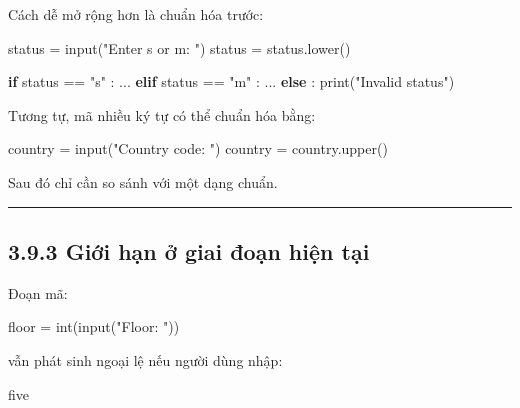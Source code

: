 \documentclass[
  11pt,
  a4paper,
]{article}
\newenvironment{Shaded}{}{}
\newcommand{\BuiltInTok}[1]{\textcolor[rgb]{0.00,0.50,0.00}{#1}}
\newcommand{\ControlFlowTok}[1]{\textcolor[rgb]{0.00,0.44,0.13}{\textbf{#1}}}
\newcommand{\NormalTok}[1]{#1}
\newcommand{\OperatorTok}[1]{\textcolor[rgb]{0.40,0.40,0.40}{#1}}
\newcommand{\StringTok}[1]{\textcolor[rgb]{0.25,0.44,0.63}{#1}}
\begin{document}
Cách dễ mở rộng hơn là chuẩn hóa trước:

\begin{Shaded}
\begin{Highlighting}[]
\NormalTok{status }\OperatorTok{=} \BuiltInTok{input}\NormalTok{(}\StringTok{"Enter s or m: "}\NormalTok{)}
\NormalTok{status }\OperatorTok{=}\NormalTok{ status.lower()}

\ControlFlowTok{if}\NormalTok{ status }\OperatorTok{==} \StringTok{"s"}\NormalTok{ :}
\NormalTok{    ...}
\ControlFlowTok{elif}\NormalTok{ status }\OperatorTok{==} \StringTok{"m"}\NormalTok{ :}
\NormalTok{    ...}
\ControlFlowTok{else}\NormalTok{ :}
    \BuiltInTok{print}\NormalTok{(}\StringTok{"Invalid status"}\NormalTok{)}
\end{Highlighting}
\end{Shaded}

Tương tự, mã nhiều ký tự có thể chuẩn hóa bằng:

\begin{Shaded}
\begin{Highlighting}[]
\NormalTok{country }\OperatorTok{=} \BuiltInTok{input}\NormalTok{(}\StringTok{"Country code: "}\NormalTok{)}
\NormalTok{country }\OperatorTok{=}\NormalTok{ country.upper()}
\end{Highlighting}
\end{Shaded}

Sau đó chỉ cần so sánh với một dạng chuẩn.

\begin{center}\rule{0.5\linewidth}{0.5pt}\end{center}

\subsection{3.9.3 Giới hạn ở giai đoạn hiện
tại}\label{giux1edbi-hux1ea1n-ux1edf-giai-ux111oux1ea1n-hiux1ec7n-tux1ea1i}

Đoạn mã:

\begin{Shaded}
\begin{Highlighting}[]
\NormalTok{floor }\OperatorTok{=} \BuiltInTok{int}\NormalTok{(}\BuiltInTok{input}\NormalTok{(}\StringTok{"Floor: "}\NormalTok{))}
\end{Highlighting}
\end{Shaded}

vẫn phát sinh ngoại lệ nếu người dùng nhập:

\begin{Shaded}
\begin{Highlighting}[]
\NormalTok{five}
\end{Highlighting}
\end{Shaded}
\end{document}
